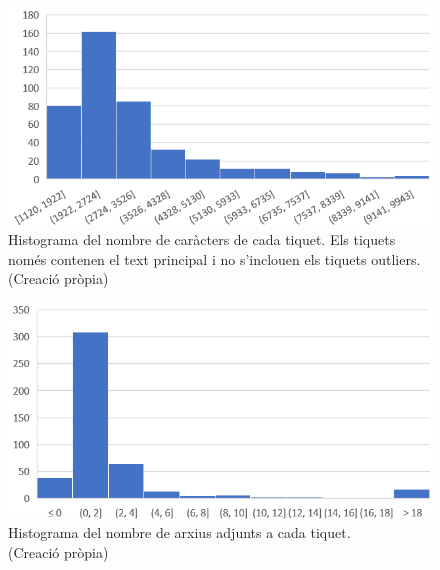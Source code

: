 \begin{figure}[H]
    \centering
    \includegraphics[width=\textwidth]{histograma_num_chars_tiquets_outliers.png}
    \caption[Histograma dels caràcters del text principal de cada tiquet sense outliers]{Histograma del nombre de caràcters de cada tiquet. Els tiquets només contenen el text principal i no s'inclouen els tiquets outliers. \\ (Creació pròpia)}
    \label{fig:histograma_num_chars_tiquets_outliers}
\end{figure}


\begin{figure}[H]
    \centering
    \includegraphics[width=\textwidth]{histograma_num_adj.png}
    \caption[Histograma del nombre d'adjunts a cada tiquet]{Histograma del nombre de arxius adjunts a cada tiquet. \\ (Creació pròpia)}
    \label{fig:histograma_num_adj}
\end{figure}


